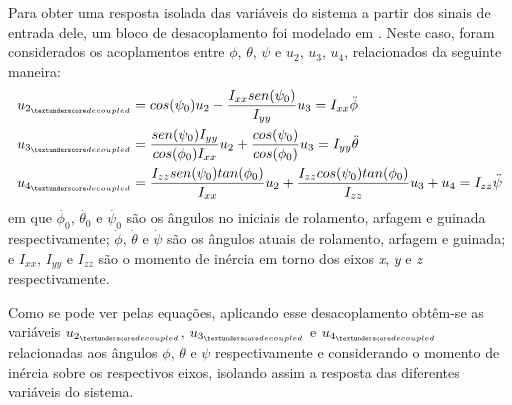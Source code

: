 Para obter uma resposta isolada das variáveis do sistema a partir dos sinais de entrada dele, um bloco de desacoplamento foi modelado em \cite[p.~62]{Balas2007}. Neste caso, foram considerados os acoplamentos entre $\phi$, $\theta$, $\psi$ e $u_2$, $u_3$, $u_4$, relacionados da seguinte maneira:
\begin{align}
u_{2_{\textunderscore decoupled}} &= cos(\psi_{0})u_2 - \frac{I_{xx}sen(\psi_{0})}{I_{yy}}u_3 = I_{xx}\ddot{\phi} \\
u_{3_{\textunderscore decoupled}} &= \frac{sen(\psi_{0})I_{yy}}{cos(\phi_{0})I_{xx}}u_2 + \frac{cos(\psi_{0})}{cos(\phi_{0})}u_3 = I_{yy}\ddot{\theta} \\
u_{4_{\textunderscore decoupled}} &= \frac{I_{zz}sen(\psi_0)tan(\phi_0)}{I_{xx}}u_2 + \frac{I_{zz}cos(\psi_0)tan(\phi_0)}{I_{zz}}u_3 + u_4 = I_{zz}\ddot{\psi} 
\end{align}
em que $\dot{\phi_0}$, $\dot{\theta_0}$ e $\dot{\psi_0}$ são os ângulos no iniciais de rolamento, arfagem e guinada respectivamente; $\dot{\phi}$, $\dot{\theta}$ e $\dot{\psi}$ são os ângulos atuais de rolamento, arfagem e guinada; e $I_{xx}$, $I_{yy}$ e $I_{zz}$ são o momento de inércia em torno dos eixos \textit{x}, \textit{y} e \textit{z} respectivamente.

Como se pode ver pelas equações, aplicando esse desacoplamento obtêm-se as variáveis $u_{2_{\textunderscore decoupled}}$, $u_{3_{\textunderscore decoupled}}$ e $u_{4_{\textunderscore decoupled}}$ relacionadas aos ângulos $\phi$, $\theta$ e $\psi$ respectivamente e considerando o momento de inércia sobre os respectivos eixos, isolando assim a resposta das diferentes variáveis do sistema.

